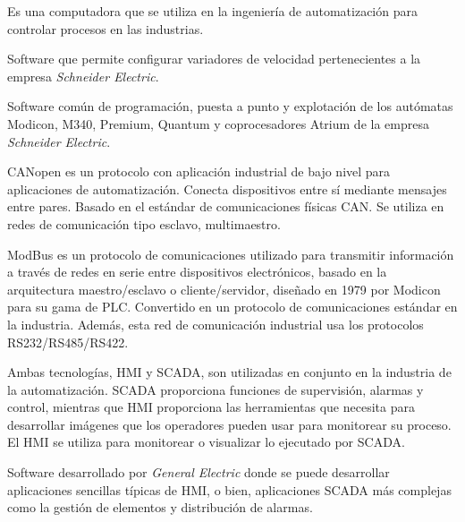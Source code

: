 \begin{tcolorbox}[colback=blue!5!white,colframe=blue!75!black,title=PLC]
	Es una computadora que se utiliza en la ingeniería de automatización para controlar procesos en las industrias.
\end{tcolorbox}

\begin{tcolorbox}[colback=blue!5!white,colframe=blue!75!black,title=SoMove]
	Software que permite configurar variadores de velocidad pertenecientes a la empresa \textit{Schneider Electric}.
\end{tcolorbox}

\begin{tcolorbox}[colback=blue!5!white,colframe=blue!75!black,title=Unity Pro]
	Software común de programación, puesta a punto y
	explotación de los autómatas Modicon, M340, Premium, Quantum y
	coprocesadores Atrium de la empresa \textit{Schneider Electric}.
\end{tcolorbox}

\begin{tcolorbox}[colback=blue!5!white,colframe=blue!75!black,title=CANopen]
	CANopen es un protocolo con aplicación industrial de bajo nivel para aplicaciones de automatización. Conecta dispositivos entre sí mediante mensajes entre pares. Basado en el estándar de comunicaciones físicas CAN. Se utiliza en redes de comunicación tipo esclavo, multimaestro. 
\end{tcolorbox}

\begin{tcolorbox}[colback=blue!5!white,colframe=blue!75!black,title=ModBus]
	ModBus es un protocolo de comunicaciones utilizado para transmitir información a través de redes en serie entre dispositivos electrónicos, basado en la arquitectura maestro/esclavo o cliente/servidor, diseñado en 1979 por Modicon para su gama de PLC. Convertido en un protocolo de comunicaciones estándar en la industria. Además, esta red de comunicación industrial usa los protocolos RS232/RS485/RS422.
\end{tcolorbox}

\begin{tcolorbox}[colback=blue!5!white,colframe=blue!75!black,title=HMI - SCADA]
	Ambas tecnologías, HMI y SCADA, son utilizadas en conjunto en la industria de la automatización. SCADA proporciona funciones de supervisión, alarmas y control, mientras que HMI proporciona las herramientas que necesita para desarrollar imágenes que los operadores pueden usar para monitorear su proceso. El HMI se utiliza para monitorear o visualizar lo ejecutado por SCADA.
\end{tcolorbox}

\begin{tcolorbox}[colback=blue!5!white,colframe=blue!75!black,title=iFIX]
	Software desarrollado por \textit{General Electric} donde se puede desarrollar aplicaciones sencillas típicas de HMI, o bien, aplicaciones SCADA más complejas como la gestión de elementos y distribución de alarmas.
\end{tcolorbox}
\newpage